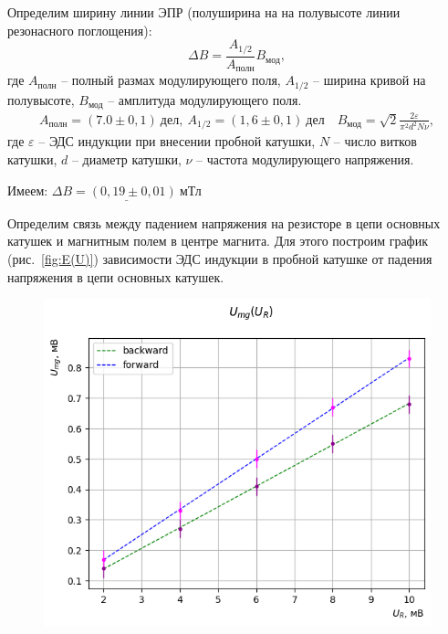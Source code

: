 \documentclass[a4paper,12pt]{article} %
\begin{document}
		Определим ширину линии ЭПР (полуширина на на полувысоте линии резонасного поглощения):
		\begin{equation*}
			\Delta B = \frac{A_{1/2}}{A_{\text{полн}}}B_\text{мод},
		\end{equation*}
		где $A_\text{полн}$ -- полный размах модулирующего поля, $A_{1/2}$ -- ширина кривой на полувысоте, $B_\text{мод}$ -- амплитуда модулирующего поля.
		\begin{equation*}
			\begin{gathered}
				A_\text{полн} = (7.0 \pm 0,1 ) \ \text{дел}, \ A_{1/2} = (1,6 \pm 0,1) \ \text{дел} \quad
				B_\text{мод} = \sqrt{2} \frac{2\varepsilon}{\pi^2d^2N\nu},
			\end{gathered}
		\end{equation*}
		где $\varepsilon$ -- ЭДС индукции при внесении пробной катушки, $N$ -- число витков катушки, $d$ -- диаметр катушки, $\nu$ -- частота модулирующего напряжения.
		
		Имеем:	$\underline{\Delta B = (0,19 \pm 0,01) \ \text{мТл}}$
		
		Определим связь между падением напряжения на резисторе в цепи основных катушек и магнитным полем в центре магнита. Для этого построим график (рис.~\ref{fig:E(U)}) зависимости ЭДС индукции в пробной катушке от падения напряжения в цепи основных катушек.
		
		\begin{figure}[]
			\begin{floatrow}
				{\includegraphics[scale=0.8]{seva_pidor.png}}    
			\end{floatrow}
		\end{figure}
\end{document}
